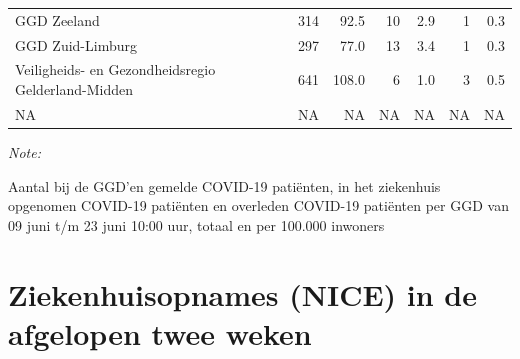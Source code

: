 \documentclass[
  english,
  man,floatsintext]{apa6}
\begin{document}
\begin{table}
\begin{threeparttable}
\begin{tabular}{lrrrrrr}
GGD Zeeland & 314 & 92.5 & 10 & 2.9 & 1 & 0.3\\
GGD Zuid-Limburg & 297 & 77.0 & 13 & 3.4 & 1 & 0.3\\
Veiligheids- en Gezondheidsregio Gelderland-Midden & 641 & 108.0 & 6 & 1.0 & 3 & 0.5\\
NA & NA & NA & NA & NA & NA & NA\\
\bottomrule
\end{tabular}
\begin{tablenotes}
\item \textit{Note: } 
\item Aantal bij de GGD’en gemelde COVID-19 patiënten, in het ziekenhuis opgenomen COVID-19 patiënten en overleden COVID-19 patiënten per GGD van 09 juni t/m 23 juni 10:00 uur, totaal en per 100.000 inwoners
\end{tablenotes}
\end{threeparttable}
\endgroup{}
\end{table}

\newpage

\hypertarget{ziekenhuisopnames-nice-in-de-afgelopen-twee-weken}{%
\section{Ziekenhuisopnames (NICE) in de afgelopen twee weken}\label{ziekenhuisopnames-nice-in-de-afgelopen-twee-weken}}
\end{document}
